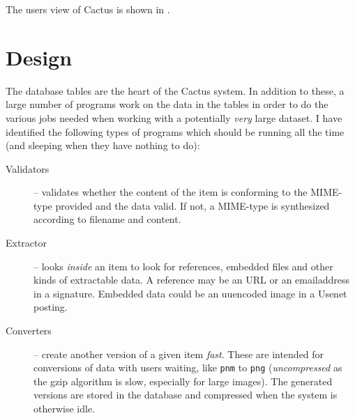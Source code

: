 The users view of Cactus is shown in
.

\section{Design}
\label{sec:cactus-design}

The database tables are the heart of the Cactus system.  In
addition to these, a large number of programs work on the
data in the tables in order to do the various jobs needed
when working with a potentially \textit{very} large dataset.
I have identified the following types of programs which
should be running all the time (and sleeping when they have
nothing to do):

\begin{description}
  
\item[Validators] -- validates whether the content
  of the item is conforming to the MIME-type provided and
  the data valid.  If not, a MIME-type is synthesized
  according to filename and content.

  

  
\item[Extractor] -- looks \textit{inside} an item to look
  for references, embedded files and other kinds of
  extractable data.  A reference may be an URL or an
  emailaddress in a signature.  Embedded data could be an
  uuencoded image in a Usenet posting.
  
\item[Converters] -- create another version of a given item
  \textit{fast}.  These are intended for conversions of data
  with users waiting, like \texttt{pnm} to
  \texttt{png} (\textit{uncompressed} as the gzip algorithm is slow,
  especially for large images).  The generated
  versions are stored in the database and compressed when
  the system is otherwise idle.

  

\end{description}
